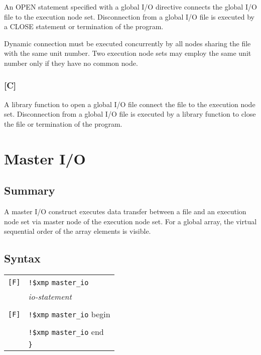   An OPEN statement specified with a global I/O directive connects the
  global I/O file to the execution node set.
  Disconnection from a global I/O file is executed by a CLOSE statement
  or termination of the program.

  Dynamic connection must be executed concurrently by all nodes sharing
  the file with the same unit number.
  Two execution node sets may employ the same unit number only if they
  have no common node.

  \subsubsection*{[C]}

  A library function to open a global I/O file connect the file to the
  execution node set.
  Disconnection from a global I/O file is executed by a library function
  to close the file or termination of the program.

  \section{Master I/O}

  \subsection*{Summary}
  A master I/O construct executes data transfer between a file and an
  execution node set via master node of the execution node set.
  For a global array, the virtual sequential order of the array elements
  is visible.

  \subsection*{Syntax}

  \begin{tabular}{ll}
   \verb![F]! & \verb|!$xmp| {\tt \verb|master_io|} \\
   & \hspace{5mm} {\it io-statement} \\
   & \\
   \verb![F]! & \verb|!$xmp| {\tt \verb|master_io|} begin \\
   & \hspace{5mm}{\it io-statement} \\
   & \verb|!$xmp| {\tt \verb|master_io|} end \\
   & {\tt \}} \\
  \end{tabular}

